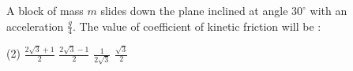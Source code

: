 \item A block of mass \(m\) slides down the plane inclined at angle \(30^\circ\) with an acceleration \(\frac{g}{4}\). The value of coefficient of kinetic friction will be :
    \begin{tasks}(2)
        \task \(\frac{2\sqrt{3} + 1}{2}\)
        \task \(\frac{2\sqrt{3} - 1}{2}\)
        \task \(\frac{1}{2\sqrt{3}}\)
        \task \(\frac{\sqrt{3}}{2}\)
    \end{tasks}